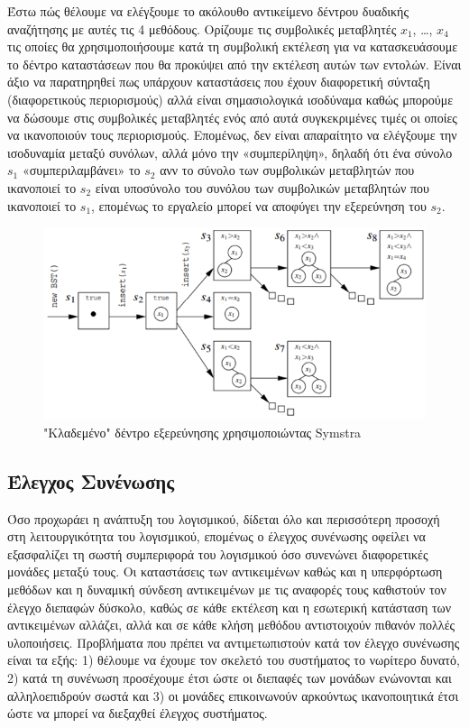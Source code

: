 \documentclass[12pt]{article}
\begin{document}
Έστω πώς θέλουμε να ελέγξουμε το ακόλουθο αντικείμενο δέντρου δυαδικής αναζήτησης με αυτές τις 4 μεθόδους. Ορίζουμε τις συμβολικές μεταβλητές $x_1$, …, $x_4$ τις οποίες θα χρησιμοποιήσουμε κατά τη συμβολική εκτέλεση για να κατασκευάσουμε το δέντρο καταστάσεων που θα προκύψει από την εκτέλεση αυτών των εντολών. Είναι άξιο να παρατηρηθεί πως υπάρχουν καταστάσεις που έχουν διαφορετική σύνταξη (διαφορετικούς περιορισμούς) αλλά είναι σημασιολογικά ισοδύναμα καθώς μπορούμε να δώσουμε στις συμβολικές μεταβλητές ενός από αυτά συγκεκριμένες τιμές οι οποίες να ικανοποιούν τους περιορισμούς. Επομένως, δεν είναι απαραίτητο να ελέγξουμε την ισοδυναμία μεταξύ συνόλων, αλλά μόνο την «συμπερίληψη», δηλαδή ότι ένα σύνολο $s_1$ «συμπεριλαμβάνει» το $s_2$ ανν το σύνολο των συμβολικών μεταβλητών που ικανοποιεί το $s_2$ είναι υποσύνολο του συνόλου των συμβολικών μεταβλητών που ικανοποιεί το $s_1$, επομένως το εργαλείο μπορεί να αποφύγει την εξερεύνηση του $s_2$.

\begin{figure}
\label{fig:symstra_example}
\caption{"Κλαδεμένο" δέντρο εξερεύνησης χρησιμοποιώντας Symstra}
\includegraphics[width=\textwidth,height=\textheight,keepaspectratio]{symstra_example.png}
\end{figure}

\subsection{Έλεγχος Συνένωσης} 

Όσο προχωράει η ανάπτυξη του λογισμικού, δίδεται όλο και περισσότερη προσοχή στη λειτουργικότητα του λογισμικού, επομένως ο έλεγχος συνένωσης οφείλει να εξασφαλίζει τη σωστή συμπεριφορά του λογισμικού όσο συνενώνει διαφορετικές μονάδες μεταξύ τους. Οι καταστάσεις των αντικειμένων καθώς και η υπερφόρτωση μεθόδων και η δυναμική σύνδεση αντικειμένων με τις αναφορές τους καθιστούν τον έλεγχο διεπαφών δύσκολο, καθώς σε κάθε εκτέλεση και η εσωτερική κατάσταση των αντικειμένων αλλάζει, αλλά και σε κάθε κλήση μεθόδου αντιστοιχούν πιθανόν πολλές υλοποιήσεις.
Προβλήματα που πρέπει να αντιμετωπιστούν κατά τον έλεγχο συνένωσης είναι τα εξής: 1) θέλουμε να έχουμε τον σκελετό του συστήματος το νωρίτερο δυνατό, 2) κατά τη συνένωση προσέχουμε έτσι ώστε οι διεπαφές των μονάδων ενώνονται και αλληλοεπιδρούν σωστά και 3) οι μονάδες επικοινωνούν αρκούντως ικανοποιητικά έτσι ώστε να μπορεί να διεξαχθεί έλεγχος συστήματος.
\cite{bashir}
\end{document}
